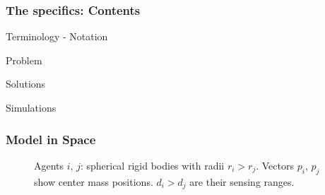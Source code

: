 \begin{frame} %
  \frametitle{The specifics: Contents}

  \begin{wideitemize}
    \item Terminology - Notation
    \item Problem
    \item Solutions
    \item Simulations
  \end{wideitemize}

\end{frame} %
\begin{frame} %
  \frametitle{Model in Space}

\begin{figure}[H]\centering
  \scalebox{0.8}{}
  \caption{Agents $i$, $j$: spherical rigid bodies with radii $r_i > r_j$.
    Vectors $p_i$, $p_j$ show center mass positions. $d_i > d_j$ are their sensing
    ranges.}
  \label{}
\end{figure}

\end{frame} %
